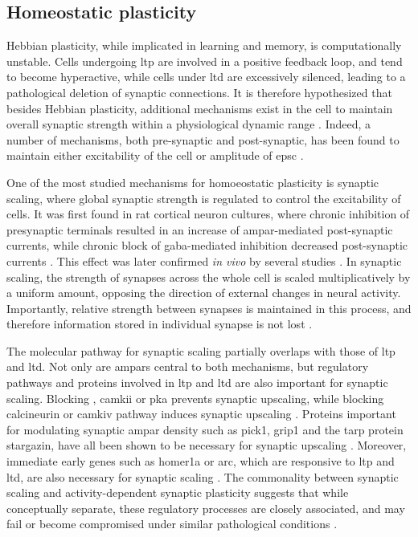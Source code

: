 \subsection{Homeostatic plasticity}
Hebbian plasticity, while implicated in learning and memory, is computationally unstable. Cells undergoing \gls{ltp} are involved in a positive feedback loop, and tend to become hyperactive, while cells under \gls{ltd} are excessively silenced, leading to a pathological deletion of synaptic connections. It is therefore hypothesized that besides Hebbian plasticity, additional mechanisms exist in the cell to maintain overall synaptic strength within a physiological dynamic range \citep{bienenstock82, cooper12}. Indeed, a number of mechanisms, both pre-synaptic and post-synaptic, has been found to maintain either excitability of the cell or amplitude of \gls{epsc} \citep{turrigiano98, frank06, collingridge10, chater14, wang16}. 

One of the most studied mechanisms for homoeostatic plasticity is synaptic scaling, where global synaptic strength is regulated to control the excitability of cells. It was first found in rat cortical neuron cultures, where chronic inhibition of presynaptic terminals resulted in an increase of \gls{ampar}-mediated post-synaptic currents, while chronic block of \gls{gaba}-mediated inhibition decreased post-synaptic currents \citep{turrigiano98}. This effect was later confirmed \textit{in vivo} by several studies \citep{whitt14}. In synaptic scaling, the strength of synapses across the whole cell is scaled multiplicatively by a uniform amount, opposing the direction of external changes in neural activity. Importantly, relative strength between synapses is maintained in this process, and therefore information stored in individual synapse is not lost \citep{turrigiano08}. 

The molecular pathway for synaptic scaling partially overlaps with those of \gls{ltp} and \gls{ltd}. Not only are \glspl{ampar} central to both mechanisms, but regulatory pathways and proteins involved in \gls{ltp} and \gls{ltd} are also important for synaptic scaling. Blocking , \gls{camkii} or \gls{pka} prevents synaptic upscaling, while blocking calcineurin or \gls{camkiv} pathway induces synaptic upscaling \citep{goel11, kim14, ibata08}. Proteins important for modulating synaptic \gls{ampar} density such as \gls{pick1}, \gls{grip1} and the \gls{tarp} protein stargazin, have all been shown to be necessary for synaptic upscaling \citep{anggono11, gainey15, louros14}. Moreover, immediate early genes such as homer1a or \gls{arc}, which are responsive to \gls{ltp} and \gls{ltd}, are also necessary for synaptic scaling \citep{hu10, gao10}. The commonality between synaptic scaling and activity-dependent synaptic plasticity suggests that while conceptually separate, these regulatory processes are closely associated, and may fail or become compromised under similar pathological conditions \citep{fernandes16}.

